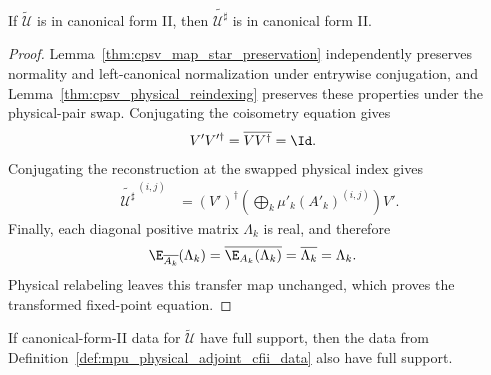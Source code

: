 \begin{lemma}
    \label{thm:mpu_physical_adjoint_cfii}
    \leanok
    If $\widetilde{\mathcal U}$ is in canonical form II, then
    $\widetilde{\mathcal U^\sharp}$ is in canonical form II.
\end{lemma}

\begin{proof}\leanok
    Lemma~\ref{thm:cpsv_map_star_preservation} independently preserves
    normality and left-canonical normalization under entrywise conjugation, and
    Lemma~\ref{thm:cpsv_physical_reindexing} preserves these properties under
    the physical-pair swap.  Conjugating the coisometry equation gives
    \begin{align}
        V'V'^\dagger
         & =\overline{VV^\dagger}=\Id.
    \end{align}
    Conjugating the reconstruction at the swapped physical index gives
    \begin{align}
        \widetilde{\mathcal U^\sharp}^{\,(i,j)}
         & =(V')^\dagger
        \left(\bigoplus_k\mu'_k(A'_k)^{(i,j)}\right)V'.
    \end{align}
    Finally, each diagonal positive matrix $\Lambda_k$ is real, and therefore
    \begin{align}
        \E_{\overline{A_k}}(\Lambda_k)
         & =\overline{\E_{A_k}(\Lambda_k)}
        =\overline{\Lambda_k}
        =\Lambda_k.
    \end{align}
    Physical relabeling leaves this transfer map unchanged, which proves the
    transformed fixed-point equation.
\end{proof}

\begin{lemma}
    \label{thm:mpu_physical_adjoint_full_support}
    \leanok
    If canonical-form-II data for $\widetilde{\mathcal U}$ have full
    support, then the data from
    Definition~\ref{def:mpu_physical_adjoint_cfii_data} also have full
    support.
\end{lemma}

